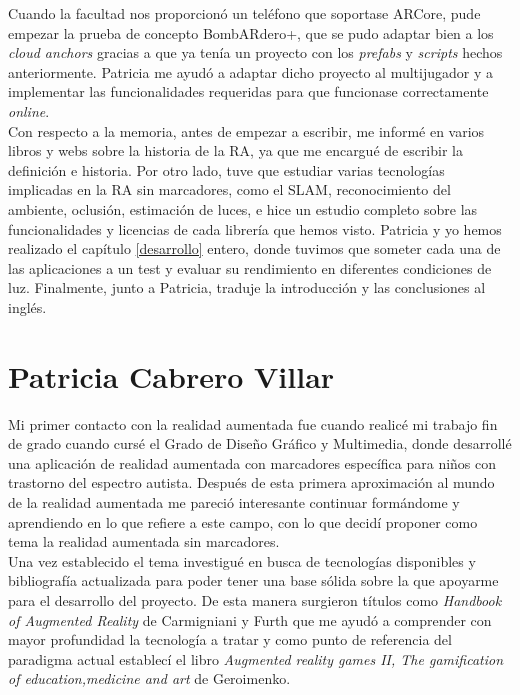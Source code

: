 Cuando la facultad nos proporcionó un teléfono que soportase ARCore, pude empezar la prueba de concepto BombARdero+, que se pudo adaptar bien a los \textit{cloud anchors} gracias a que ya tenía un proyecto con los \textit{prefabs} y \textit{scripts} hechos anteriormente. Patricia me ayudó a adaptar dicho proyecto al multijugador y a implementar las funcionalidades requeridas para que funcionase correctamente \textit{online}.\\

Con respecto a la memoria, antes de empezar a escribir, me informé en varios libros y webs sobre la historia de la RA, ya que me encargué de escribir la definición e historia. Por otro lado, tuve que estudiar varias tecnologías implicadas en la RA sin marcadores, como el SLAM, reconocimiento del ambiente, oclusión, estimación de luces, e hice un estudio completo sobre las funcionalidades y licencias de cada librería que hemos visto. Patricia y yo hemos realizado el capítulo \ref{desarrollo} entero, donde tuvimos que someter cada una de las aplicaciones a un test y evaluar su rendimiento en diferentes condiciones de luz. Finalmente, junto a Patricia, traduje la introducción y las conclusiones al inglés.


\section{Patricia Cabrero Villar}

Mi primer contacto con la realidad aumentada fue cuando realicé mi trabajo fin de grado cuando cursé el Grado de Diseño Gráfico y Multimedia, donde desarrollé una aplicación de realidad aumentada con marcadores específica para niños con trastorno del espectro autista.
Después de esta primera aproximación al mundo de la realidad aumentada me pareció interesante continuar formándome y aprendiendo en lo que refiere a este campo, con lo que decidí proponer como tema la realidad aumentada sin marcadores.\\

Una vez establecido el tema investigué en busca de tecnologías disponibles y bibliografía actualizada para poder tener una base sólida sobre la que apoyarme para el desarrollo del proyecto. De esta manera surgieron títulos como \textit{Handbook of Augmented Reality} de Carmigniani y Furth que me ayudó a comprender con mayor profundidad la tecnología a tratar y como punto de  referencia del paradigma actual establecí el libro \textit{Augmented reality games II, The gamification of education,medicine and art} de Geroimenko.\\

